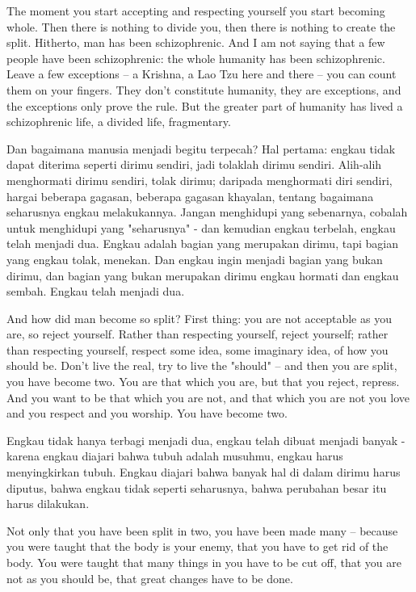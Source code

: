 \english
The moment you start accepting and respecting yourself you start becoming whole. Then there is nothing to divide you, then there is nothing to create the split. Hitherto, man has been schizophrenic. And I am not saying that a few people have been schizophrenic: the whole humanity has been schizophrenic. Leave a few exceptions -- a Krishna, a Lao Tzu here and there -- you can count them on your fingers. They don't constitute humanity, they are exceptions, and the exceptions only prove the rule. But the greater part of humanity has lived a schizophrenic life, a divided life, fragmentary.

\bahasa
Dan bagaimana manusia menjadi begitu terpecah? Hal pertama: engkau tidak dapat diterima seperti dirimu sendiri, jadi tolaklah dirimu sendiri. Alih-alih menghormati dirimu sendiri, tolak dirimu; daripada menghormati diri sendiri, hargai beberapa gagasan, beberapa gagasan khayalan, tentang bagaimana seharusnya engkau melakukannya. Jangan menghidupi yang sebenarnya, cobalah untuk menghidupi yang "seharusnya" - dan kemudian engkau terbelah, engkau telah menjadi dua. Engkau adalah bagian yang merupakan dirimu, tapi bagian yang engkau tolak, menekan. Dan engkau ingin menjadi bagian yang bukan dirimu, dan bagian yang bukan merupakan dirimu engkau hormati dan engkau sembah. Engkau telah menjadi dua.

\english
And how did man become so split? First thing: you are not acceptable as you are, so reject yourself. Rather than respecting yourself, reject yourself; rather than respecting yourself, respect some idea, some imaginary idea, of how you should be. Don't live the real, try to live the "should" -- and then you are split, you have become two. You are that which you are, but that you reject, repress. And you want to be that which you are not, and that which you are not you love and you respect and you worship. You have become two.

\bahasa
Engkau tidak hanya terbagi menjadi dua, engkau telah dibuat menjadi banyak - karena engkau diajari bahwa tubuh adalah musuhmu, engkau harus menyingkirkan tubuh. Engkau diajari bahwa banyak hal di dalam dirimu harus diputus, bahwa engkau tidak seperti seharusnya, bahwa perubahan besar itu harus dilakukan.

\english
Not only that you have been split in two, you have been made many -- because you were taught that the body is your enemy, that you have to get rid of the body. You were taught that many things in you have to be cut off, that you are not as you should be, that great changes have to be done.

